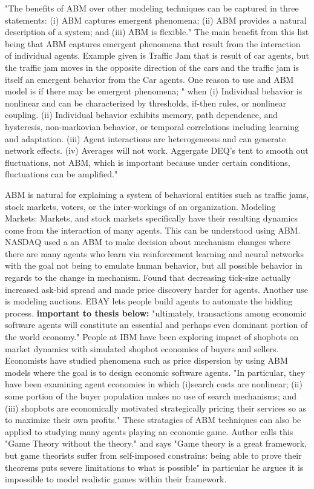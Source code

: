 \documentclass[12pt,twoside]{reedthesis}
\begin{document}
"The benefits of ABM over other modeling techniques can be captured in three statements: (i)  ABM captures emergent phenomena; (ii) ABM provides a natural description of a system; and (iii) ABM is flexible." The main benefit from this list being that ABM captures emergent phenomena that result from the interaction of individual agents. Example given is Traffic Jam that is result of car agents, but the traffic jam moves in the opposite direction of the cars and the traffic jam is itself an emergent behavior from the Car agents. One reason to use and ABM model is if there may be emergent phenomena; " when (i) Individual behavior is nonlinear and can be characterized by thresholds, if-then rules, or nonlinear coupling. (ii) Individual behavior exhibits memory, path dependence, and hysteresis, non-markovian behavior, or temporal correlations including learning and adaptation. (iii) Agent interactions are heterogeneous and can generate network effects. (iv) Averages will not work. Aggergate DEQ's tent to smooth out fluctuations, not ABM, which is important because under certain conditions, fluctuations can be amplified."

ABM is natural for explaining a system of behavioral entities such as traffic jams, stock markets, voters, or the inter-workings of an organization. Modeling Markets: Markets, and stock markets specifically have their resulting dynamics come from the interaction of many agents. This can be understood using ABM. NASDAQ used a an ABM to make decision about mechanism changes where there are many agents who learn via reinforcement learning and neural networks with the goal not being to emulate human behavior, but all possible behavior in regards to the change in mechanism. Found that decreasing tick-size actually increased ask-bid spread and made price discovery harder for agents. Another use is modeling auctions. EBAY lets people build agents to automate the bidding process. \textbf{important to thesis below:} "ultimately, transactions among economic software agents will constitute an essential and perhaps even dominant portion of the world economy." People at IBM have been exploring impact of shopbots on market dynamics with simulated shopbot economies of buyers and sellers. Economists have studied phenomena such as price dispersion by using ABM models where the goal is to design economic software agents. "In particular, they have been examining agent economies in which (i)search costs are nonlinear; (ii) some portion of the buyer population makes no use of search mechanisms; and (iii) shopbots are economically motivated strategically pricing their services so as to maximize their own profits." These stratagies of ABM techniques can also be applied to studying many agents playing an economic game. Author calls this "Game Theory without the theory." and says "Game theory is a great framework, but game theorists suffer from self-imposed constrains: being able to prove their theorems puts severe limitations to what is possible" in particular he argues it is impossible to model realistic games within their framework.
\end{document}
